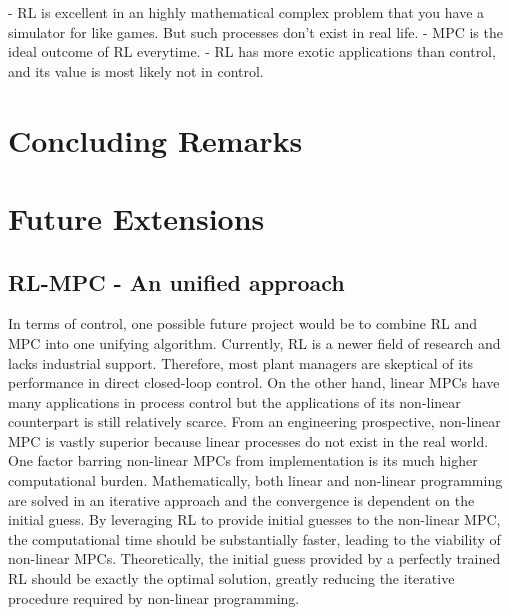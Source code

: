 - RL is excellent in an highly mathematical complex problem that you have a simulator for like games.  But such processes don't exist in real life.
- MPC is the ideal outcome of RL everytime.
- RL has more exotic applications than control, and its value is most likely not in control.

\section{Concluding Remarks}

\section{Future Extensions}
\subsection{RL-MPC - An unified approach}
In terms of control, one possible future project would be to combine RL and MPC into one unifying algorithm.  Currently, RL is a newer field of research and lacks industrial support. Therefore, most plant managers are skeptical of its performance in direct closed-loop control. On the other hand, linear MPCs have many applications in process control but the applications of its non-linear counterpart is still relatively scarce. From an engineering prospective, non-linear MPC is vastly superior because linear processes do not exist in the real world. One factor barring non-linear MPCs from implementation is its much higher computational burden. Mathematically, both linear and non-linear programming are solved in an iterative approach and the convergence is dependent on the initial guess.  By leveraging RL to provide initial guesses to the non-linear MPC, the computational time should be substantially faster, leading to the viability of non-linear MPCs. Theoretically, the initial guess provided by a perfectly trained RL should be exactly the optimal solution, greatly reducing the iterative procedure required by non-linear programming.  